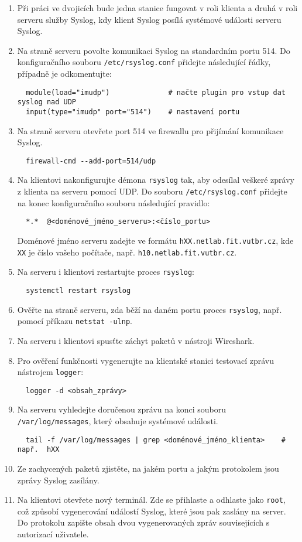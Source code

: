 \documentclass[a4paper,11pt]{article}
\begin{document}
\begin{enumerate}
  \item Při práci ve dvojicích bude jedna stanice fungovat v roli klienta a druhá v roli serveru služby Syslog, kdy klient Syslog posílá systémové události serveru Syslog.
  \item Na straně serveru povolte komunikaci Syslog na standardním portu 514. Do konfiguračního souboru {\tt /etc/rsyslog.conf} přidejte následující řádky, případně je odkomentujte:
    \vspace{-2mm}
\begin{verbatim}
  module(load="imudp")              # načte plugin pro vstup dat syslog nad UDP
  input(type="imudp" port="514")    # nastavení portu
\end{verbatim}
  \item Na straně serveru otevřete port 514 ve firewallu pro přijímání komunikace Syslog.
\begin{verbatim}
  firewall-cmd --add-port=514/udp
\end{verbatim}
  \item  Na klientovi nakonfigurujte démona {\tt rsyslog} tak, aby odesílal veškeré zprávy z klienta na serveru pomocí UDP.
    Do souboru {\tt /etc/rsyslog.conf} přidejte na konec konfiguračního souboru následující pravidlo:
\begin{verbatim} 
  *.*  @<doménové_jméno_serveru>:<číslo_portu>
\end{verbatim}
    {\small Doménové jméno serveru zadejte ve formátu \texttt{hXX.netlab.fit.vutbr.cz}, kde \texttt{XX} je číslo vašeho počítače, např. \texttt{h10.netlab.fit.vutbr.cz}.}
  \item Na serveru i klientovi restartujte proces {\tt rsyslog}: 
\begin{verbatim}
  systemctl restart rsyslog
\end{verbatim} 
  \item Ověřte na straně serveru, zda běží na daném portu proces {\tt rsyslog}, např. pomocí příkazu \verb|netstat -ulnp|.
  \item Na serveru i klientovi spusťte záchyt paketů v nástroji Wireshark. 
  \item Pro ověření funkčnosti vygenerujte na klientské stanici testovací zprávu nástrojem {\tt logger}:
\begin{verbatim} 
  logger -d <obsah_zprávy>
\end{verbatim} 
  \item Na serveru vyhledejte doručenou zprávu na konci souboru {\tt /var/log/messages}, který obsahuje
        systémové události.
\begin{verbatim} 
  tail -f /var/log/messages | grep <doménové_jméno_klienta>    # např.  hXX
\end{verbatim} 
  \item Ze zachycených paketů zjistěte, na jakém portu a jakým protokolem jsou zprávy Syslog zasílány.
  \item Na klientovi otevřete nový terminál. Zde se přihlaste a odhlaste jako {\tt root}, což způsobí vygenerování událostí Syslog, které jsou pak zaslány na server. Do protokolu zapište obsah dvou vygenerovaných zpráv souvisejících s autorizací uživatele.
\end{enumerate}
\end{document}
